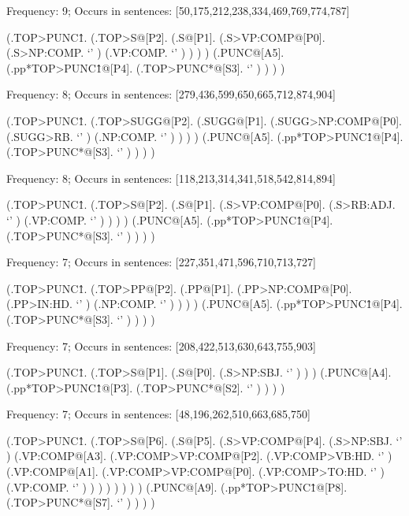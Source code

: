 \documentclass[10pt]{article}
\begin{document}
Frequency: 9; Occurs in sentences: [50,175,212,238,334,469,769,774,787]


\begin{parsetree} (.TOP>PUNC\^1. (.TOP>S@[P2]. (.S@[P1]. (.S>VP:COMP@[P0]. (.S>NP:COMP. `' ) (.VP:COMP. `' ) ) ) ) (.PUNC@[A5]. (.pp*TOP>PUNC\^1@[P4]. (.TOP>PUNC*@[S3]. `' ) ) ) ) \end{parsetree}

Frequency: 8; Occurs in sentences: [279,436,599,650,665,712,874,904]


\begin{parsetree} (.TOP>PUNC\^1. (.TOP>SUGG@[P2]. (.SUGG@[P1]. (.SUGG>NP:COMP@[P0]. (.SUGG>RB. `' ) (.NP:COMP. `' ) ) ) ) (.PUNC@[A5]. (.pp*TOP>PUNC\^1@[P4]. (.TOP>PUNC*@[S3]. `' ) ) ) ) \end{parsetree}

Frequency: 8; Occurs in sentences: [118,213,314,341,518,542,814,894]


\begin{parsetree} (.TOP>PUNC\^1. (.TOP>S@[P2]. (.S@[P1]. (.S>VP:COMP@[P0]. (.S>RB:ADJ. `' ) (.VP:COMP. `' ) ) ) ) (.PUNC@[A5]. (.pp*TOP>PUNC\^1@[P4]. (.TOP>PUNC*@[S3]. `' ) ) ) ) \end{parsetree}

Frequency: 7; Occurs in sentences: [227,351,471,596,710,713,727]


\begin{parsetree} (.TOP>PUNC\^1. (.TOP>PP@[P2]. (.PP@[P1]. (.PP>NP:COMP@[P0]. (.PP>IN:HD. `' ) (.NP:COMP. `' ) ) ) ) (.PUNC@[A5]. (.pp*TOP>PUNC\^1@[P4]. (.TOP>PUNC*@[S3]. `' ) ) ) ) \end{parsetree}

Frequency: 7; Occurs in sentences: [208,422,513,630,643,755,903]


\begin{parsetree} (.TOP>PUNC\^1. (.TOP>S@[P1]. (.S@[P0]. (.S>NP:SBJ. `' ) ) ) (.PUNC@[A4]. (.pp*TOP>PUNC\^1@[P3]. (.TOP>PUNC*@[S2]. `' ) ) ) ) \end{parsetree}

Frequency: 7; Occurs in sentences: [48,196,262,510,663,685,750]


\begin{parsetree} (.TOP>PUNC\^1. (.TOP>S@[P6]. (.S@[P5]. (.S>VP:COMP@[P4]. (.S>NP:SBJ. `' ) (.VP:COMP@[A3]. (.VP:COMP>VP:COMP@[P2]. (.VP:COMP>VB:HD. `' ) (.VP:COMP@[A1]. (.VP:COMP>VP:COMP@[P0]. (.VP:COMP>TO:HD. `' ) (.VP:COMP. `' ) ) ) ) ) ) ) ) (.PUNC@[A9]. (.pp*TOP>PUNC\^1@[P8]. (.TOP>PUNC*@[S7]. `' ) ) ) ) \end{parsetree}
\end{document}
